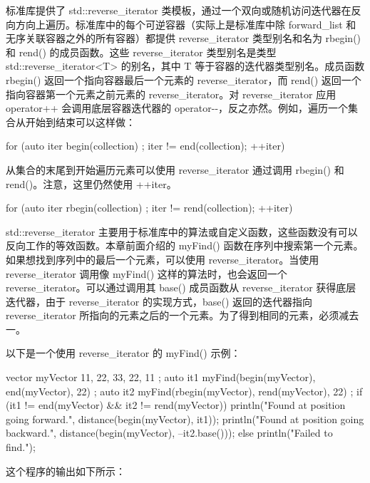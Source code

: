 
标准库提供了 std::reverse\_iterator 类模板，通过一个双向或随机访问迭代器在反向方向上遍历。标准库中的每个可逆容器（实际上是标准库中除 forward\_list 和无序关联容器之外的所有容器）都提供 reverse\_iterator 类型别名和名为 rbegin() 和 rend() 的成员函数。这些 reverse\_iterator 类型别名是类型 std::reverse\_iterator<T> 的别名，其中 T 等于容器的迭代器类型别名。成员函数 rbegin() 返回一个指向容器最后一个元素的 reverse\_iterator，而 rend() 返回一个指向容器第一个元素之前元素的 reverse\_iterator。对 reverse\_iterator 应用 operator++ 会调用底层容器迭代器的 operator-{}-，反之亦然。例如，遍历一个集合从开始到结束可以这样做：

\begin{cpp}
for (auto iter { begin(collection) }; iter != end(collection); ++iter) {}
\end{cpp}

从集合的末尾到开始遍历元素可以使用 reverse\_iterator 通过调用 rbegin() 和 rend()。注意，这里仍然使用 ++iter。

\begin{cpp}
for (auto iter { rbegin(collection) }; iter != rend(collection); ++iter) {}
\end{cpp}

std::reverse\_iterator 主要用于标准库中的算法或自定义函数，这些函数没有可以反向工作的等效函数。本章前面介绍的 myFind() 函数在序列中搜索第一个元素。如果想找到序列中的最后一个元素，可以使用 reverse\_iterator。当使用 reverse\_iterator 调用像 myFind() 这样的算法时，也会返回一个 reverse\_iterator。可以通过调用其 base() 成员函数从 reverse\_iterator 获得底层迭代器，由于 reverse\_iterator 的实现方式，base() 返回的迭代器指向 reverse\_iterator 所指向的元素之后的一个元素。为了得到相同的元素，必须减去一。

以下是一个使用 reverse\_iterator 的 myFind() 示例：

\begin{cpp}
vector myVector { 11, 22, 33, 22, 11 };
auto it1 { myFind(begin(myVector), end(myVector), 22) };
auto it2 { myFind(rbegin(myVector), rend(myVector), 22) };
if (it1 != end(myVector) && it2 != rend(myVector)) {
    println("Found at position {} going forward.",
             distance(begin(myVector), it1));
    println("Found at position {} going backward.",
             distance(begin(myVector), --it2.base()));
} else {
    println("Failed to find.");
}
\end{cpp}

这个程序的输出如下所示：

